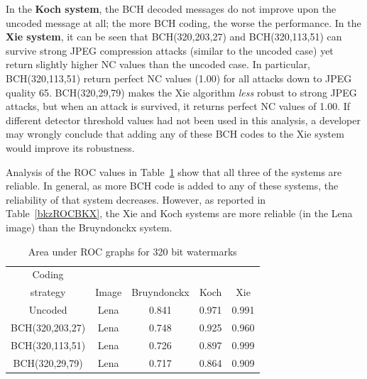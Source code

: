 \documentclass[10pt,twocolumn]{article}
\begin{document}
In the {\bf Koch system}, the BCH decoded messages do not improve upon the
	uncoded message at all; the more BCH coding, the worse the performance.
In the {\bf Xie system}, it can be seen that 
BCH(320,203,27) and BCH(320,113,51) can survive strong JPEG compression attacks (similar to the 
uncoded case) yet return slightly higher NC values than the uncoded case. In particular, 
BCH(320,113,51) return perfect NC values (1.00) for all attacks down to JPEG quality 65. 
BCH(320,29,79) makes the Xie algorithm \emph{less} robust to strong JPEG attacks, but when an attack is
survived, it returns perfect NC values of 1.00. If different detector threshold values had not been used in
this analysis, a developer may wrongly conclude that 
adding any of these BCH codes to the Xie system would improve its robustness.

Analysis of the ROC values in Table~\ref{tab:rocLenaBKX} show that all three of the systems are reliable. 
In general, as more BCH code is added to any of these systems, the reliability of that system decreases.
However, as reported in Table~\ref{bkzROCBKX}, the Xie and Koch systems are more reliable (in the Lena
image) than the Bruyndonckx system. 
\begin{table}[!t]
\setlength{\abovecaptionskip}{-0.1cm}
\footnotesize
        \begin{center}
                \begin{tabular}{|c|c|c|c|c|} \hline
                Coding 			& 	& 		& 	& 	\\ 
		strategy		& Image	& Bruyndonckx   & Koch  & Xie   \\ \hline
                Uncoded         	& Lena	& 0.841         & 0.971 & 0.991 \\ \hline
                BCH(320,203,27) 	& Lena	& 0.748         & 0.925 & 0.960 \\ \hline
                BCH(320,113,51) 	& Lena	& 0.726         & 0.897 & 0.999 \\ \hline
                BCH(320,29,79)  	& Lena	& 0.717         & 0.864 & 0.909 \\ \hline
                \end{tabular}
        \end{center}
	\caption{Area under ROC graphs for 320 bit watermarks}
        \label{tab:rocLenaBKX}
\end{table}
\normalsize
\end{document}
